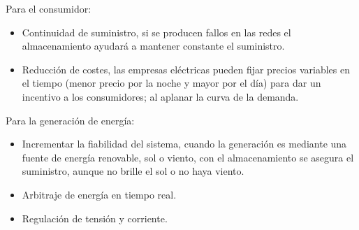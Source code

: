                  Para el consumidor:\par
                    
                \begin{itemize} [label=•]
                    \setlength{\itemindent}{1.5em}
                        \item Continuidad de suministro, si se producen fallos en las redes el almacenamiento ayudará a mantener constante el suministro.\par
                        \item Reducción de costes, las empresas eléctricas pueden fijar precios variables en el tiempo (menor precio por la noche y mayor por el día) para dar un incentivo a los consumidores; al aplanar la curva de la demanda.\par
                \end{itemize}
                    
                 Para la generación de energía:\par
                 
                 \begin{itemize} [label=•]
                    \setlength{\itemindent}{1.5em}
                        \item Incrementar la fiabilidad del sistema, cuando la generación es mediante una fuente de energía renovable, sol o viento, con el almacenamiento se asegura el suministro, aunque no brille el sol o no haya viento.\par
                        \item Arbitraje de energía en tiempo real.\par
                        \item Regulación de tensión y corriente.\par
                \end{itemize}

